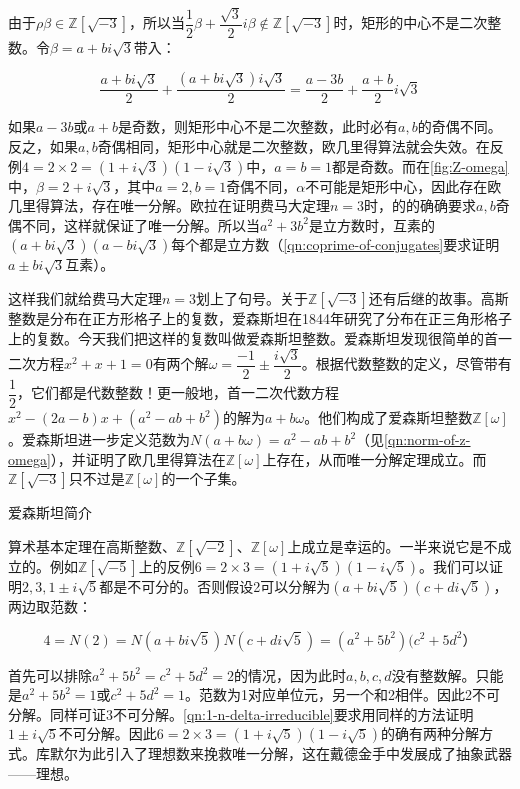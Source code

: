 \documentclass[b5paper]{ctexart}
\begin{document}
由于$\rho \beta \in \mathbb{Z}[\sqrt{-3}]$，所以当$\dfrac{1}{2}\beta + \dfrac{\sqrt{3}}{2}i\beta \notin \mathbb{Z}[\sqrt{-3}]$时，矩形的中心不是二次整数。令$\beta = a + bi\sqrt{3}$带入：

\[
\frac{a + bi\sqrt{3}}{2} + \frac{(a + bi\sqrt{3})i\sqrt{3}}{2} = \frac{a - 3b}{2} + \frac{a + b}{2}i\sqrt{3}
\]

如果$a-3b$或$a + b$是奇数，则矩形中心不是二次整数，此时必有$a, b$的奇偶不同。反之，如果$a, b$奇偶相同，矩形中心就是二次整数，欧几里得算法就会失效。在反例$4 = 2 \times 2 = (1 + i\sqrt{3})(1 - i\sqrt{3})$中，$a = b = 1$都是奇数。而在\cref{fig:Z-omega}中，$\beta = 2 + i\sqrt{3}$，其中$a = 2, b=1$奇偶不同，$\alpha$不可能是矩形中心，因此存在欧几里得算法，存在唯一分解。欧拉在证明费马大定理$n=3$时，的的确确要求$a, b$奇偶不同，这样就保证了唯一分解。所以当$a^2 + 3b^2$是立方数时，互素的$(a + bi\sqrt{3})(a - bi\sqrt{3})$每个都是立方数（\cref{qn:coprime-of-conjugates}要求证明$a \pm bi\sqrt{3}$互素）。

这样我们就给费马大定理$n=3$划上了句号。关于$\mathbb{Z}[\sqrt{-3}]$还有后继的故事。高斯整数是分布在正方形格子上的复数，爱森斯坦在1844年研究了分布在正三角形格子上的复数。今天我们把这样的复数叫做爱森斯坦整数。爱森斯坦发现很简单的首一二次方程$x^2 + x + 1 = 0$有两个解$\omega = \dfrac{-1}{2} \pm \dfrac{i\sqrt{3}}{2}$。根据代数整数的定义，尽管带有$\dfrac{1}{2}$，它们都是代数整数！更一般地，首一二次代数方程$x^2 - (2a - b)x + (a^2 - ab + b^2)$的解为$a + b \omega$。他们构成了爱森斯坦整数$\mathbb{Z}[\omega]$。爱森斯坦进一步定义范数为$N(a + b\omega) = a^2 -ab + b^2$（见\cref{qn:norm-of-z-omega}），并证明了欧几里得算法在$\mathbb{Z}[\omega]$上存在，从而唯一分解定理成立。而$\mathbb{Z}[\sqrt{-3}]$只不过是$\mathbb{Z}[\omega]$的一个子集。

\begin{mdframed}
爱森斯坦简介
\end{mdframed}

算术基本定理在高斯整数、$\mathbb{Z}[\sqrt{-2}]$、$\mathbb{Z}[\omega]$上成立是幸运的。一半来说它是不成立的。例如$\mathbb{Z}[\sqrt{-5}]$上的反例$6 = 2 \times 3 = (1 + i\sqrt{5})(1 - i\sqrt{5})$。我们可以证明$2, 3, 1 \pm i\sqrt{5}$都是不可分的。否则假设2可以分解为$(a + bi\sqrt{5})(c + di\sqrt{5})$，两边取范数：

\[
4 = N(2) = N(a + bi\sqrt{5})N(c + di\sqrt{5}) = (a^2 + 5b^2)(c^2 + 5d^2）
\]

首先可以排除$a^2 + 5b^2 = c^2 + 5d^2 = 2$的情况，因为此时$a, b, c, d$没有整数解。只能是$a^2 + 5b^2 = 1$或$c^2 + 5d^2 = 1$。范数为1对应单位元，另一个和2相伴。因此2不可分解。同样可证3不可分解。\cref{qn:1-n-delta-irreducible}要求用同样的方法证明$1 \pm i\sqrt{5}$不可分解。因此$6 = 2 \times 3 = (1 + i\sqrt{5})(1 - i\sqrt{5})$的确有两种分解方式。库默尔为此引入了理想数来挽救唯一分解，这在戴德金手中发展成了抽象武器——理想。
\end{document}
